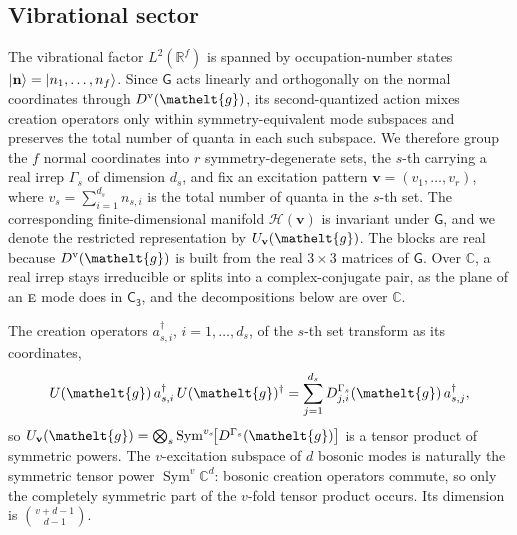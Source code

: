 \documentclass[
  reprint,
  aps,
  prx,
  superscriptaddress,
  amsmath,
  amssymb,
  longbibliography
]{revtex4-2}
\newcommand{\eltfont}[1]{{\let\sigma\eltsigma\mathelt{#1}}}
\newcommand{\grp}[1]{\mathsf{#1}}
\newcommand{\irr}[1]{\text{\normalfont\scshape #1}}
\newcommand{\elt}[1]{\eltfont{#1}}
\newcommand{\gel}{\elt{g}}             %
\begin{document}
\subsection{Vibrational sector}
\label{sec:vib_sector}

The vibrational factor \(L^2(\mathbb R^f)\) is spanned by occupation-number states \(\ket{\mathbf n}=\ket{n_1,\ldots,n_f}\). Since \(\grp{G}\) acts linearly and orthogonally on the normal coordinates through \(D^{\mathrm{v}}(\gel)\), its second-quantized action mixes creation operators only within symmetry-equivalent mode subspaces and preserves the total number of quanta in each such subspace. We therefore group the \(f\) normal coordinates into \(r\) symmetry-degenerate sets, the \(s\)-th carrying a real irrep \(\Gamma_s\) of dimension \(d_s\), and fix an excitation pattern \(\mathbf v=(v_1,\ldots,v_r)\), where
\(
v_s=\sum_{i=1}^{d_s}n_{s,i}
\)
is the total number of quanta in the \(s\)-th set. The corresponding finite-dimensional manifold \(\mathcal H(\mathbf v)\) is invariant under \(\grp{G}\), and we denote the restricted representation by \(U_{\mathbf v}(\gel)\). The blocks are real because $D^{\mathrm v}(\gel)$ is built from the real $3\times3$ matrices of $\grp{G}$. Over $\mathbb C$, a real irrep stays irreducible or splits into a complex-conjugate pair, as the plane of an $\irr{e}$ mode does in $\grp{C_{3}}$, and the decompositions below are over $\mathbb C$.

The creation operators $a^\dagger_{s,i}$, $i=1,\dots,d_s$, of the $s$-th set transform as its coordinates,
\begin{equation}
U(\gel)\,a^\dagger_{s,i}\,U(\gel)^{\dagger}=\sum_{j=1}^{d_s}D^{\Gamma_s}_{j,i}(\gel)\,a^\dagger_{s,j},
\label{eq:creation_transform}
\end{equation}
so $U_{\mathbf v}(\gel)=\bigotimes_s \operatorname{Sym}^{v_s}\!\bigl[D^{\Gamma_s}(\gel)\bigr]$ is a tensor product of symmetric powers.
The \(v\)-excitation subspace of \(d\) bosonic modes is naturally the symmetric tensor power \(\operatorname{Sym}^v\mathbb C^d\): bosonic creation operators commute, so only the completely symmetric part of the \(v\)-fold tensor product occurs. Its dimension is \(\binom{v+d-1}{d-1}\).
\end{document}
